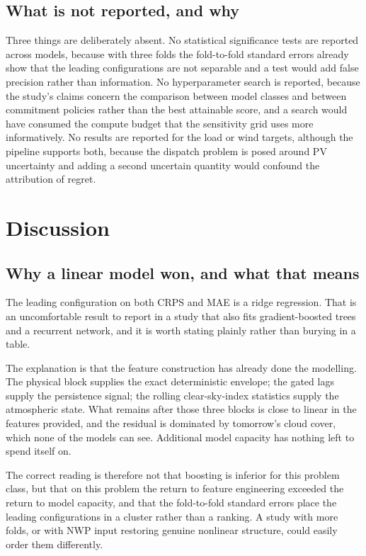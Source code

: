 \documentclass[11pt,a4paper,oneside]{report}
\begin{document}
\section{What is not reported, and why}

Three things are deliberately absent. No statistical significance tests are reported across models, because with three folds the fold-to-fold standard errors already show that the leading configurations are not separable and a test would add false precision rather than information. No hyperparameter search is reported, because the study's claims concern the comparison between model classes and between commitment policies rather than the best attainable score, and a search would have consumed the compute budget that the sensitivity grid uses more informatively. No results are reported for the load or wind targets, although the pipeline supports both, because the dispatch problem is posed around PV uncertainty and adding a second uncertain quantity would confound the attribution of regret.


\chapter{Discussion}

\section{Why a linear model won, and what that means}

The leading configuration on both CRPS and MAE is a ridge regression. That is an uncomfortable result to report in a study that also fits gradient-boosted trees and a recurrent network, and it is worth stating plainly rather than burying in a table.

The explanation is that the feature construction has already done the modelling. The physical block supplies the exact deterministic envelope; the gated lags supply the persistence signal; the rolling clear-sky-index statistics supply the atmospheric state. What remains after those three blocks is close to linear in the features provided, and the residual is dominated by tomorrow's cloud cover, which none of the models can see. Additional model capacity has nothing left to spend itself on.

The correct reading is therefore not that boosting is inferior for this problem class, but that on this problem the return to feature engineering exceeded the return to model capacity, and that the fold-to-fold standard errors place the leading configurations in a cluster rather than a ranking. A study with more folds, or with NWP input restoring genuine nonlinear structure, could easily order them differently.
\end{document}
